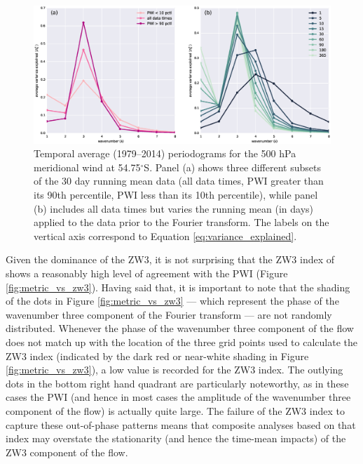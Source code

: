 \begin{figure}
\begin{center}
\includegraphics[width=1\columnwidth]{figures/zonalwaves/va-r2spectrum_ERAInterim_500hPa_daily_native-55S.eps}
\caption[Temporal average (1979--2014) periodograms for the 500 hPa meridional wind at 54.75$^{\circ}$S]{\label{fig:periodograms}
Temporal average (1979--2014) periodograms for the 500 hPa meridional wind at 54.75$^{\circ}$S. Panel (a) shows three different subsets of the 30 day running mean data (all data times, PWI greater than its 90th percentile, PWI less than its 10th percentile), while panel (b) includes all data times but varies the running mean (in days) applied to the data prior to the Fourier transform. The labels on the vertical axis correspond to Equation \ref{eq:variance_explained}.}
\end{center}
\end{figure}


Given the dominance of the ZW3, it is not surprising that the ZW3 index of \citet{Raphael2004} shows a reasonably high level of agreement with the PWI (Figure \ref{fig:metric_vs_zw3}). Having said that, it is important to note that the shading of the dots in Figure \ref{fig:metric_vs_zw3} --- which represent the phase of the wavenumber three component of the Fourier transform --- are not randomly distributed. Whenever the phase of the wavenumber three component of the flow does not match up with the location of the three grid points used to calculate the ZW3 index (indicated by the dark red or near-white shading in Figure \ref{fig:metric_vs_zw3}), a low value is recorded for the ZW3 index. The outlying dots in the bottom right hand quadrant are particularly noteworthy, as in these cases the PWI (and hence in most cases the amplitude of the wavenumber three component of the flow) is actually quite large. The failure of the ZW3 index to capture these out-of-phase patterns means that composite analyses based on that index may overstate the stationarity (and hence the time-mean impacts) of the ZW3 component of the flow.

